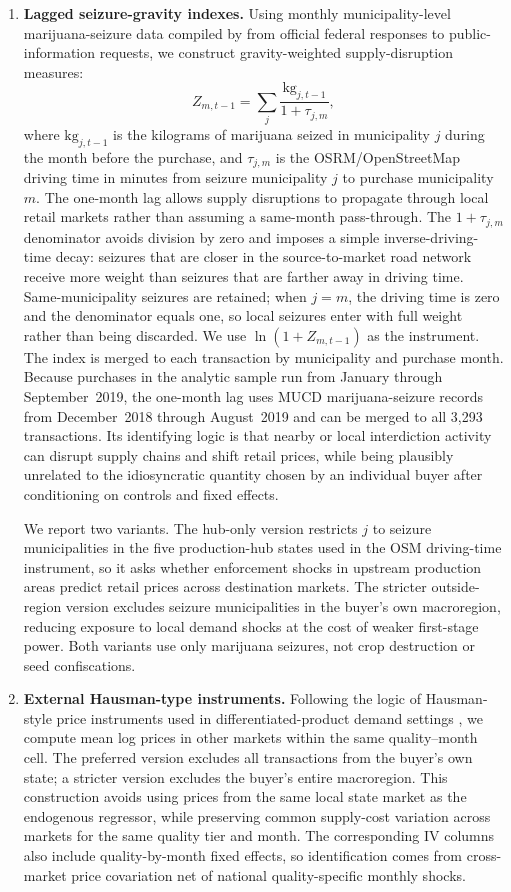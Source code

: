 \begin{enumerate}
  \item \textbf{Lagged seizure-gravity indexes.}  Using monthly municipality-level marijuana-seizure data compiled by \citet{mucd2019seizures} from official federal responses to public-information requests, we construct gravity-weighted supply-disruption measures:
  \[
    Z_{m,t-1} = \sum_j \frac{\text{kg}_{j,t-1}}{1+\tau_{j,m}},
  \]
  where $\text{kg}_{j,t-1}$ is the kilograms of marijuana seized in municipality $j$ during the month before the purchase, and $\tau_{j,m}$ is the OSRM/OpenStreetMap driving time in minutes from seizure municipality $j$ to purchase municipality $m$.  The one-month lag allows supply disruptions to propagate through local retail markets rather than assuming a same-month pass-through.  The $1+\tau_{j,m}$ denominator avoids division by zero and imposes a simple inverse-driving-time decay: seizures that are closer in the source-to-market road network receive more weight than seizures that are farther away in driving time.  Same-municipality seizures are retained; when $j=m$, the driving time is zero and the denominator equals one, so local seizures enter with full weight rather than being discarded.  We use $\ln(1+Z_{m,t-1})$ as the instrument.  The index is merged to each transaction by municipality and purchase month.  Because purchases in the analytic sample run from January through September~2019, the one-month lag uses MUCD marijuana-seizure records from December~2018 through August~2019 and can be merged to all 3{,}293 transactions.  Its identifying logic is that nearby or local interdiction activity can disrupt supply chains and shift retail prices, while being plausibly unrelated to the idiosyncratic quantity chosen by an individual buyer after conditioning on controls and fixed effects.

  We report two variants.  The hub-only version restricts $j$ to seizure municipalities in the five production-hub states used in the OSM driving-time instrument, so it asks whether enforcement shocks in upstream production areas predict retail prices across destination markets.  The stricter outside-region version excludes seizure municipalities in the buyer's own macroregion, reducing exposure to local demand shocks at the cost of weaker first-stage power.  Both variants use only marijuana seizures, not crop destruction or seed confiscations.

  \item \textbf{External Hausman-type instruments.}  Following the logic of Hausman-style price instruments used in differentiated-product demand settings \citep{hausman1994competitive,nevo2001cereal}, we compute mean log prices in other markets within the same quality--month cell.  The preferred version excludes all transactions from the buyer's own state; a stricter version excludes the buyer's entire macroregion.  This construction avoids using prices from the same local state market as the endogenous regressor, while preserving common supply-cost variation across markets for the same quality tier and month.  The corresponding IV columns also include quality-by-month fixed effects, so identification comes from cross-market price covariation net of national quality-specific monthly shocks.
\end{enumerate}


